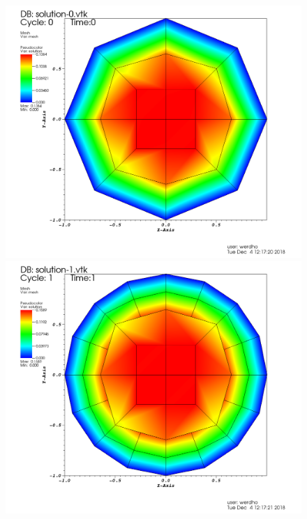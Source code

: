 \documentclass[11pt,fullpage]{article}
\theoremstyle{lemma}
\theoremstyle{definition}
\theoremstyle{lemma}
\begin{document}
\begin{figure}[!ht]
	\begin{minipage}{.45\paperwidth}
		\centering
		\includegraphics[scale=.12]{Step6-1.png}
	\end{minipage}%
	\begin{minipage}{.4\paperwidth}
		\centering
		\includegraphics[scale=.12]{Step6-2.png}
	\end{minipage}
	\begin{minipage}{.45\paperwidth}

\end{minipage}
\end{figure}
\end{document}
